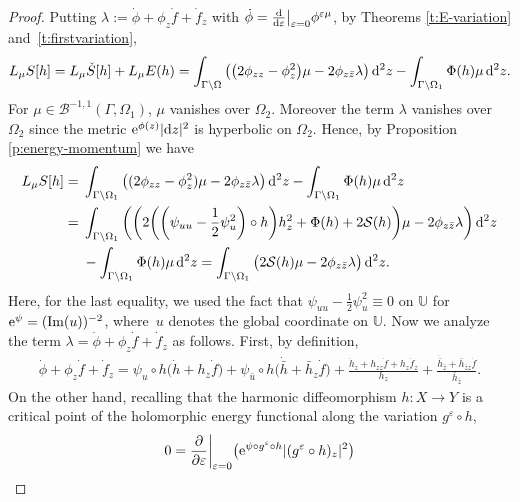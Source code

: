 \documentclass[pdftex]{sigma}%
\numberwithin{equation}{section}
\newcommand{\vep}{\varepsilon}
\begin{document}
\begin{proof}
Putting $\lambda:=\dot{\phi}+\phi_z \dot{f} +\dot{f}_z$ with $\dot{\phi}=\frac{\rm d}{{\rm d}\vep}\big|_{\vep=0} \phi^{\vep\mu}$,
by Theorems \ref{t:E-variation} and~\ref{t:firstvariation},
\begin{gather*}
L_{\mu} S[h]= L_{\mu} \check{S}[h] +L_{\mu} E(h)
= \int_{\Gamma\backslash\Omega} \big(\big(2\phi_{zz}-\phi^2_z\big)\mu -2\phi_{z\bar{z}} \lambda\big)\, {\rm d}^2z -\int_{\Gamma\backslash\Omega_1} \Phi(h) \mu\, {\rm d}^2z.
\end{gather*}
For $\mu\in \mathcal{B}^{-1,1}(\Gamma,\Omega_1)$, $\mu$ vanishes over $\Omega_2$. Moreover the term $\lambda$ vanishes over $\Omega_2$ since the metric ${\rm e}^{\phi(z)}|{\rm d}z|^2$ is hyperbolic on $\Omega_2$. Hence, by Proposition \ref{p:energy-momentum} we have
\begin{align*}
L_{\mu} S[h]={}& \int_{\Gamma\backslash\Omega_1} \big((2\phi_{zz}-\phi^2_z)\mu -2\phi_{z\bar{z}} \lambda \big)\, {\rm d}^2z -\int_{\Gamma\backslash\Omega_1} \Phi(h) \mu\, {\rm d}^2z
\\
= {}&\int_{\Gamma\backslash\Omega_1} \bigg(\bigg(2\bigg(\bigg(\psi_{uu}-\frac12 \psi^2_u \bigg)\circ h\bigg) h_z^2+ \Phi(h) + 2\mathcal{S}(h) \bigg) \mu - 2\phi_{z\bar{z}}\lambda \bigg) \, {\rm d}^2z
\\
&-\int_{\Gamma\backslash\Omega_1} \Phi(h) \mu\, {\rm d}^2z
= \int_{\Gamma\backslash\Omega_1} \big( 2\mathcal{S}(h)\mu - 2\phi_{z\bar{z}}\lambda \big) \, {\rm d}^2z.
\end{align*}
Here, for the last equality, we used the fact that $\psi_{uu}-\frac12 \psi^2_u \equiv 0$ on $\mathbb{U}$ for ${\rm e}^\psi= (\mathrm{Im}(u))^{-2}$, where~$u$ denotes the global coordinate on $\mathbb{U}$.
Now we analyze the term $\lambda=\dot{\phi} +\phi_z \dot{f} + \dot{f}_z$ as follows. First, by definition,
\begin{gather}\label{e:lambda-var}
\dot{\phi}+\phi_z\dot{f}+\dot{f}_z = \psi_u\circ h \big(\dot{h}\!+h_z \dot{f} \big) +\psi_{\bar{u}} \circ h \big(\dot{\bar{h}}\!+ \bar{h}_z \dot{f}\big)
 + \frac{\dot{h}_z\!+h_{zz}\dot{f} \!+h_z \dot{f}_z}{ h_z}+ \frac{\dot{\bar{h}}_{\bar{z}}\!+\bar{h}_{\bar{z}z}\dot{f}}{ \bar{h}_{\bar{z}}}.
\end{gather}
On the other hand, recalling that the harmonic diffeomorphism $h\colon X\to Y$ is a critical point of the holomorphic energy functional along the variation $g^\vep \circ h$,
\begin{gather*}
0=\frac{\partial}{\partial\vep}\bigg|_{\vep=0} \big({\rm e}^{\psi\circ g^\vep \circ h} |(g^\vep \circ h)_z|^2 \big)

\end{gather*}
\end{proof}
\end{document}
